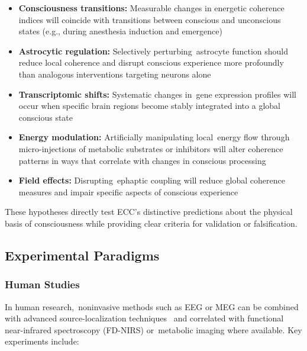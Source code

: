 \begin{itemize}
    \item \textbf{Consciousness transitions:} Measurable changes in energetic coherence indices will coincide with transitions between conscious and unconscious states (e.g., during anesthesia induction and emergence)~\cite{Mashour2018, Dehaene2011}
    
    \item \textbf{Astrocytic regulation:} Selectively perturbing~astrocyte function should reduce local coherence and disrupt conscious experience more profoundly than analogous interventions targeting neurons alone~\cite{Poskanzer2016, pellerin2004neuroenergetics}
    
    \item \textbf{Transcriptomic shifts:} Systematic changes in~gene expression profiles will occur when specific brain regions become stably integrated into a global conscious state~\cite{Tasic2018, Girdhar2025}
    
    \item \textbf{Energy modulation:} Artificially manipulating local~energy flow through micro-injections of metabolic substrates or inhibitors will alter coherence patterns in ways that correlate with changes in conscious processing~\cite{DiNuzzo2017, Magistretti2018}
    
    \item \textbf{Field effects:} Disrupting~ephaptic coupling will reduce global coherence measures and impair specific aspects of conscious experience~\cite{anastassiou2015ephaptic, chiang2019slow}
\end{itemize}

These hypotheses directly test ECC's distinctive predictions about the physical basis of consciousness while providing clear criteria for validation or falsification.

\subsection*{Experimental Paradigms}

\subsubsection*{Human Studies}

In human research,~noninvasive methods such as EEG or MEG can be combined with advanced source-localization techniques~\cite{Michel2018, Tsuchiya2015} and correlated with functional near-infrared spectroscopy (FD-NIRS) or~metabolic imaging where available. Key experiments include:

